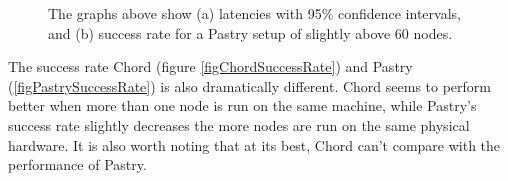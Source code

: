 \begin{figure}[htb]
  \centering
  \caption{The graphs above show (a) latencies with 95\% confidence intervals, and (b) success rate for a Pastry setup of slightly above 60 nodes.}
\end{figure}

The success rate Chord (figure \ref{figChordSuccessRate}) and Pastry (\ref{figPastrySuccessRate}) is also dramatically different. Chord seems to perform better when more than one node is run on the same machine, while Pastry's success rate slightly decreases the more nodes are run on the same physical hardware. It is also worth noting that at its best, Chord can't compare with the performance of Pastry.

